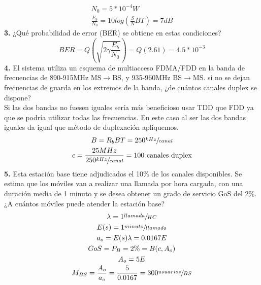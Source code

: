 \begin{exercise}[4]
	\begin{gather*}
		N_0=5*10^{-4}W\\
		\frac{E_b}{N_0}=10log(\frac{S}{N}BT)=7dB
	\end{gather*}
	\textbf{3.} ¿Qué probabilidad de error (BER) se obtiene en estas condiciones? \\
	\[BER=Q(\sqrt{2\gamma\frac{E_b}{N_0}})=Q(2.61)=4.5*10^{-3}\]
	\textbf{4.} El sistema utiliza un esquema de multiacceso FDMA/FDD en la banda de frecuencias de 890-915MHz MS$\to$BS, y 935-960MHz BS$\to$MS. si no se dejan frecuencias de guarda en los extremos de la banda, ¿de cuántos canales duplex se dispone?\\
	Si las dos bandas no fuesen iguales sería más beneficioso usar TDD que FDD ya que se podría utilizar todas las frecuencias. En este caso al ser las dos bandas iguales da igual que método de duplexación apliquemos.
	\begin{gather*}
		B=R_bBT=250\sfrac{kHz}{canal}\\
		c=\frac{25MHz}{250\sfrac{kHz}{canal}}=100\text{ canales duplex}
	\end{gather*}
	\textbf{5.} Esta estación base tiene adjudicados el 10\% de los canales disponibles. Se estima que los móviles van a realizar una llamada por hora cargada, con una duración media de 1 minuto y se desea obtener un grado de servicio GoS del 2\%. ¿A cuántos móviles puede atender la estación base?\\
	\begin{gather*}
	\lambda=1\sfrac{llamada}{HC}\\
	E(s)=1\sfrac{minuto}{llamada}\\
	a_o=E(s)\lambda=0.0167E\\
	GoS=P_B=2\%=B(c,A_o)\\
	A_o=5E\\
	M_{BS}=\frac{A_o}{a_o}=\frac{5}{0.0167}=300\sfrac{usuarios}{BS}
\end{gather*}
\end{exercise}
